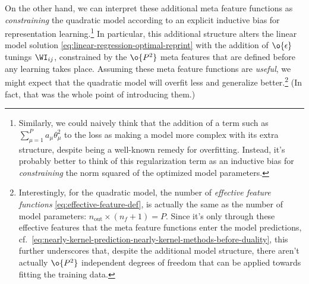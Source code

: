 On the other hand, we can interpret these additional meta feature functions as \emph{constraining} the quadratic model according to an explicit inductive bias for representation learning.\footnote{
Similarly, we could naively think that the addition of a  term such as $\sum_{\mu=1}^P a_{\mu}\theta_\mu^2$ to the loss as making a model more complex with its extra structure, despite being a well-known remedy for overfitting. Instead, it's probably better to think of this regularization term as an inductive bias for \emph{constraining} the norm squared of the optimized model parameters.\label{footnote:regularization-again}
}
In particular, this additional structure alters the linear model solution \eqref{eq:linear-regression-optimal-reprint} with the addition of $\o{\epsilon}$ tunings $\WI_{ij}$, constrained by the $\o{P^2}$ meta features that are defined before any learning takes place.
Assuming these meta feature functions are \emph{useful}, we might expect that the quadratic model will overfit less and generalize better.\footnote{Interestingly, for the quadratic model, the number of \emph{effective feature functions} \eqref{eq:effective-feature-def}, is actually the same as the number of model parameters: $n_{\text{out}} \times (n_f +1) = P$.
Since it's only through these effective features that the meta feature functions enter the model predictions, cf.~\eqref{eq:nearly-kernel-prediction-nearly-kernel-methods-before-duality}, this further underscores that, despite the additional model structure, there aren't actually $\o{P^2}$ independent degrees of freedom that can be applied towards fitting the training data.
} (In fact, that was the whole point of introducing them.)







 

